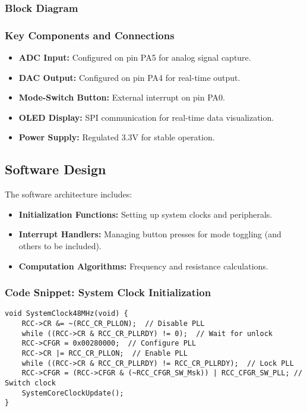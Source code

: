 \documentclass[12pt]{article}
\begin{document}
\subsubsection{Block Diagram}

\subsubsection{Key Components and Connections}
\begin{itemize}[leftmargin=2em]
    \item \textbf{ADC Input:} Configured on pin PA5 for analog signal capture.
    \item \textbf{DAC Output:} Configured on pin PA4 for real-time output.
    \item \textbf{Mode-Switch Button:} External interrupt on pin PA0.
    \item \textbf{OLED Display:} SPI communication for real-time data visualization.
    \item \textbf{Power Supply:} Regulated 3.3V for stable operation.
\end{itemize}

\subsection{Software Design}
The software architecture includes:
\begin{itemize}[leftmargin=2em]
    \item \textbf{Initialization Functions:} Setting up system clocks and peripherals.
    \item \textbf{Interrupt Handlers:} Managing button presses for mode toggling (and others to be included).
    \item \textbf{Computation Algorithms:} Frequency and resistance calculations.
\end{itemize}

\newpage

\subsubsection{Code Snippet: System Clock Initialization}
\begin{lstlisting}[caption=System Clock Initialization, label=lst:SystemClockInit]
void SystemClock48MHz(void) {
    RCC->CR &= ~(RCC_CR_PLLON);  // Disable PLL
    while ((RCC->CR & RCC_CR_PLLRDY) != 0);  // Wait for unlock
    RCC->CFGR = 0x00280000;  // Configure PLL
    RCC->CR |= RCC_CR_PLLON;  // Enable PLL
    while ((RCC->CR & RCC_CR_PLLRDY) != RCC_CR_PLLRDY);  // Lock PLL
    RCC->CFGR = (RCC->CFGR & (~RCC_CFGR_SW_Msk)) | RCC_CFGR_SW_PLL; // Switch clock
    SystemCoreClockUpdate();
}
\end{lstlisting}
\end{document}
